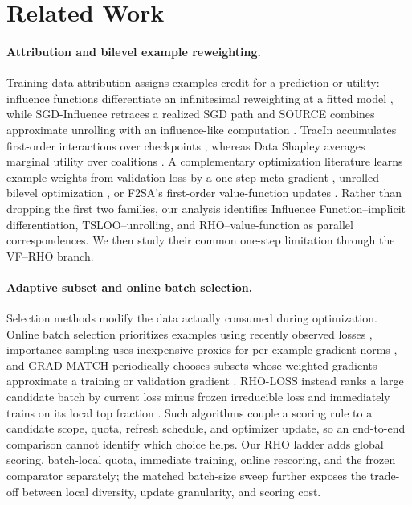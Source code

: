 \section{Related Work}

\paragraph{Attribution and bilevel example reweighting.}
Training-data attribution assigns examples credit for a prediction or utility:
influence functions differentiate an infinitesimal reweighting at a fitted
model \citep{koh2017influence}, while SGD-Influence retraces a realized SGD
path \citep{hara2019sgdinfluence} and SOURCE combines approximate unrolling
with an influence-like computation \citep{bae2024source}. TracIn accumulates
first-order interactions over checkpoints \citep{pruthi2020tracin}, whereas
Data Shapley averages marginal utility over coalitions
\citep{ghorbani2019datashapley}. A complementary optimization literature learns
example weights from validation loss by a one-step meta-gradient
\citep{ren2018reweight}, unrolled bilevel optimization
\citep{franceschi2018bilevel}, or F2SA's first-order value-function updates
\citep{kwon2023f2sa}. Rather than dropping the first two families, our analysis
identifies Influence Function--implicit differentiation, TSLOO--unrolling, and
RHO--value-function as parallel correspondences. We then study their common
one-step limitation through the VF--RHO branch.

\paragraph{Adaptive subset and online batch selection.}
Selection methods modify the data actually consumed during optimization.
Online batch selection prioritizes examples using recently observed losses
\citep{loshchilov2016online}, importance sampling uses inexpensive proxies for
per-example gradient norms \citep{katharopoulos2018importance}, and
GRAD-MATCH periodically chooses subsets whose weighted gradients approximate a
training or validation gradient \citep{killamsetty2021gradmatch}. RHO-LOSS
instead ranks a large candidate batch by current loss minus frozen
irreducible loss and immediately trains on its local top fraction
\citep{mindermann2022rholoss}. Such algorithms couple a scoring rule to a
candidate scope, quota, refresh schedule, and optimizer update, so an end-to-end
comparison cannot identify which choice helps. Our RHO ladder adds global
scoring, batch-local quota, immediate training, online rescoring, and the
frozen comparator separately; the matched batch-size sweep further exposes the
trade-off between local diversity, update granularity, and scoring cost.
